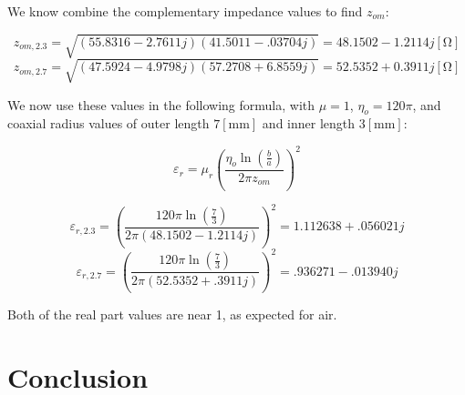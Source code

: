 \documentclass[
	letterpaper, %
	10pt, %
]{CSUniSchoolLabReport}
\begin{document}
We know combine the complementary impedance values to find $z_{om}$:

$$z_{om,2.3}=\sqrt{(55.8316-2.7611j)(41.5011-.03704j)}=48.1502-1.2114j[\si{\ohm}]$$
$$z_{om,2.7}=\sqrt{(47.5924-4.9798j)(57.2708+6.8559j)}=52.5352+0.3911j[\si{\ohm}]$$

We now use these values in the following formula, with $\mu=1$, $\eta_o=120\pi$, and coaxial radius values of outer length $7[\si{\milli\meter}]$ and inner length $3[\si{\milli\meter}]$:

$$\varepsilon_r=\mu_r\left(  \frac{\eta_o\ln\left( \frac{b}{a} \right)}{2\pi z_{om}}\right)^2$$

$$\varepsilon_{r,2.3}=\left( \frac{120\pi\ln\left(\frac{7}{3}\right)}{2\pi(48.1502-1.2114j)} \right)^2=1.112638+.056021j$$
$$\varepsilon_{r,2.7}=\left( \frac{120\pi\ln\left(\frac{7}{3}\right)}{2\pi(52.5352+.3911j)} \right)^2=.936271-.013940j$$

Both of the real part values are near 1, as expected for air.

\section{Conclusion}
\end{document}
